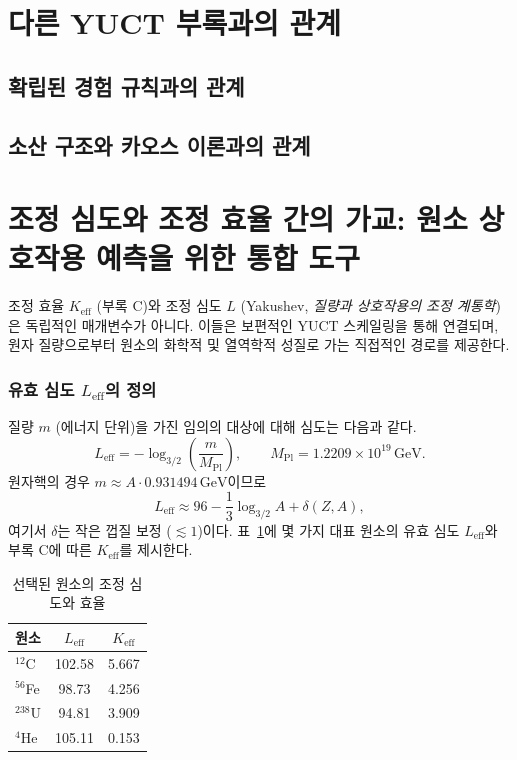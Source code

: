 \documentclass[11pt,a4paper]{article}
\begin{document}
	\endgroup
	
	\section{다른 YUCT 부록과의 관계}
	\subsection{확립된 경험 규칙과의 관계}
	\subsection{소산 구조와 카오스 이론과의 관계}
	
	\section{조정 심도와 조정 효율 간의 가교: 원소 상호작용 예측을 위한 통합 도구}
	\label{subsec:bridge}
	
	조정 효율 \(K_{\mathrm{eff}}\) (부록 C)와 조정 심도 \(L\) (Yakushev, \textit{질량과 상호작용의 조정 계통학}\cite{YKmass})은 독립적인 매개변수가 아니다.  
	이들은 보편적인 YUCT 스케일링을 통해 연결되며, 원자 질량으로부터 원소의 화학적 및 열역학적 성질로 가는 직접적인 경로를 제공한다.
	
	\subsubsection{유효 심도 \(L_{\mathrm{eff}}\)의 정의}
	질량 \(m\) (에너지 단위)을 가진 임의의 대상에 대해 심도는 다음과 같다.
	\begin{equation}
		L_{\mathrm{eff}} = -\log_{3/2}\!\left(\frac{m}{M_{\mathrm{Pl}}}\right),
		\qquad M_{\mathrm{Pl}} = 1.2209\times10^{19}\,\text{GeV}.
	\end{equation}
	원자핵의 경우 \(m \approx A \cdot 0.931494\,\text{GeV}\)이므로
	\begin{equation}
		L_{\mathrm{eff}} \approx 96 - \frac{1}{3}\log_{3/2}A + \delta(Z,A),
	\end{equation}
	여기서 \(\delta\)는 작은 껍질 보정 (\(\lesssim 1\))이다.  
	표~\ref{tab:L_Keff}에 몇 가지 대표 원소의 유효 심도 \(L_{\mathrm{eff}}\)와 부록 C에 따른 \(K_{\mathrm{eff}}\)를 제시한다.
	
	\begin{table}[htbp]
		\centering
		\caption{선택된 원소의 조정 심도와 효율}
		\label{tab:L_Keff}
		\begin{tabular}{@{}lcc@{}}
			\toprule
			원소 & \(L_{\mathrm{eff}}\) & \(K_{\mathrm{eff}}\) \\
			\midrule
			$^{12}$C & 102.58 & 5.667 \\
			$^{56}$Fe & 98.73 & 4.256 \\
			$^{238}$U & 94.81 & 3.909 \\
			$^{4}$He & 105.11 & 0.153 \\
			\bottomrule
		\end{tabular}
	\end{table}
	
\end{document}

